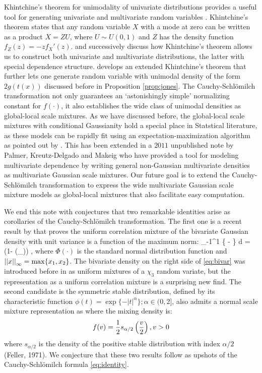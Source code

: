 \documentclass[lineno]{biometrika}
\def\CS{Cauchy-Schl\"omilch }
\begin{document}
Khintchine's theorem for unimodality of univariate distributions provides a useful tool for generating univariate and multivariate random variables \citep{bryson1982constructing}. Khintchine's theorem states that any random variable $X$ with a mode at zero can be written as a product $X = ZU$, where $U \sim U(0,1)$ and $Z$ has the density function $f_Z(z) = -zf_{X}'(z)$. \citep{bryson1982constructing} and successively \cite{jones2010distributions,jones2012khintchine} discuss how Khintchine's theorem allows us to construct both univariate and multivariate distributions, the latter with special dependence structure. \cite{jones2014generating} develops an extended Khintchine's theorem that further lets one generate random variable with unimodal density of the form $2g(t(x))$ discussed before in Proposition \ref{prop:jones}. The \CS transformation not only guarantees an `astonishingly simple' normalizing constant for $f(\cdot)$, it also establishes the wide class of unimodal densities as global-local scale mixtures. As we have discussed before, the global-local scale mixtures with conditional Gaussianity hold a special place in Statstical literature, as these models can be rapidly fit using an expectation-maximization algorithm as pointed out by \cite{polson2013data}. This has been extended in a $2011$ unpublished note by Palmer, Kreutz-Delgado and Makeig who have provided a tool for modeling multivariate dependence by writing general non-Gaussian multivariate densities as multivariate Gaussian scale mixtures. Our future goal is to extend the \CS transformation to express the wide multivariate Gaussian scale mixture models as global-local mixtures that also facilitate easy computation. \par

We end this note with conjectures that two remarkable identities arise as corollaries of the \CS transformation. The first one is a recent result by \cite{zhang2014uniform} that proves the uniform correlation mixture of the bivariate Gaussian density with unit variance is a function of the maximum norm: 
\beq
\int_{-1}^{1} \half {} \exp \left\{ -  \right\} d \rho = 
 \half (1- \Phi(_{\infty})) \label{eq:bivar}, 
\eeq
where $\Phi(\cdot)$ is the standard normal distribution function and $\left|\left|x\right|\right|_{\infty} = \max \{ x_1, x_2\}$. The bivariate density on the right side of \eqref{eq:bivar} was introduced before in \cite{bryson1982constructing} as uniform mixtures of a $\chi_3$ random variate, but the representation as a uniform correlation mixture is a surprising new find. The second candidate is the symmetric stable distribution, defined by its characteristic function $\phi(t) = \exp\{ -|t|^{\alpha} \}; \alpha \in (0,2]$, also admits a normal scale mixture representation as where the mixing density is: 
$$
f(v) = \frac{1}{2} s_{\alpha/2} \left( \frac{v}{2} \right), v > 0 
$$
where $s_{\alpha/2}$ is the density of the positive stable distribution with index $\alpha / 2$ (Feller, 1971). We conjecture that these two results follow as upshots of the \CS formula \eqref{eq:identity}. 



\end{document}
